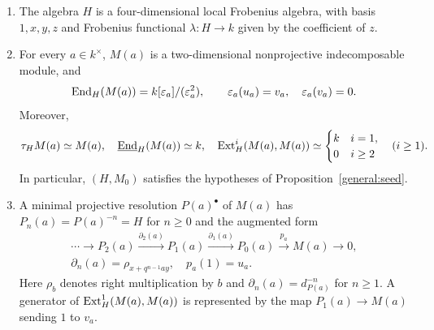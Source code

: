 \documentclass[11pt]{article}
\begin{document}
\begin{Lem}\label{seed:quantum-pair}
\leavevmode
\begin{enumerate}
\item
The algebra $H$ is a four-dimensional local Frobenius algebra, with
basis $1,x,y,z$ and Frobenius functional $\lambda:H\to k$ given by
the coefficient of $z$.

\item\label{seed:pair-modules}
For every $a\in k^\times$, $M(a)$ is a two-dimensional nonprojective
indecomposable module, and
\[
 {\rm End}_H(M(a))=k[\varepsilon_a]/(\varepsilon_a^2),\qquad
 \varepsilon_a(u_a)=v_a,\quad\varepsilon_a(v_a)=0.
\]
Moreover,
\[
 \tau_HM(a)\simeq M(a),\quad \underline{{\rm End}}_H(M(a))\simeq k,\quad
 {\rm Ext}_H^i(M(a),M(a))\simeq
 \begin{cases}k&i=1,\\0&i\ge2\end{cases}
 \quad(i\ge1).
\]
In particular, $(H,M_0)$ satisfies the hypotheses of
Proposition~\ref{general:seed}.

\item\label{seed:pair-resolution}
A minimal projective resolution $P(a)^\bullet$ of $M(a)$ has
$P_n(a)=P(a)^{-n}=H$ for $n\ge0$ and the augmented form
\begin{equation*}
 \begin{gathered}
 \cdots\longrightarrow P_2(a)\xrightarrow{\partial_2(a)}P_1(a)
 \xrightarrow{\partial_1(a)}P_0(a)\xrightarrow{p_a}M(a)
 \longrightarrow0,\\
 \partial_n(a)=\rho_{x+q^{n-1}ay},\quad p_a(1)=u_a.
 \end{gathered}
\end{equation*}
Here $\rho_b$ denotes right multiplication by $b$ and
$\partial_n(a)=d_{P(a)}^{-n}$ for $n\ge1$.
A generator of ${\rm Ext}_H^1(M(a),M(a))$ is represented by the map
$P_1(a)\to M(a)$ sending $1$ to $v_a$.
\end{enumerate}
\end{Lem}
\end{document}
